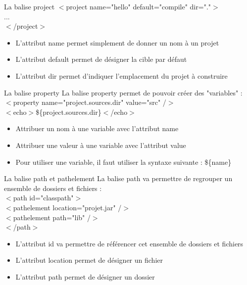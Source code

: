 \documentclass{beamer}
\begin{document}
\begin{frame}{La balise project}
    $<$project name="hello" default="compile" dir="."$>$\\
    ...\\
    $<$/project$>$
    \newline
    \newline
    \begin{itemize}
        \item L'attribut name permet simplement de donner un nom à un projet
        \item L'attribut default permet de d\'esigner la cible par d\'efaut
        \item L'attribut dir permet d'indiquer l'emplacement du projet à construire
    \end{itemize}
\end{frame}

\begin{frame}{La balise property}
    La balise property permet de pouvoir cr\'eer des "variables" :\\
    $<$property name="project.sources.dir" value="src" /$>$\\
    $<$echo$>$\$\{project.sources.dir\}$<$/echo$>$
    \newline
    \newline
    \begin{itemize}
        \item Attribuer un nom \`a une variable avec l'attribut name
        \item Attribuer une valeur \`a une variable avec l'attribut value
        \item Pour utiliser une variable, il faut utiliser la syntaxe suivante : \$\{name\}
    \end{itemize}
\end{frame}

\begin{frame}{La balise path et pathelement}
    La balise path va permettre de regrouper un ensemble de dossiers et fichiers :\\
    $<$path id="classpath"$>$\\
    $<$pathelement location="projet.jar" /$>$\\
    $<$pathelement path="lib" /$>$\\
    $<$/path$>$
    \newline
    \newline
    \begin{itemize}
        \item L'attribut id va permettre de r\'ef\'erencer cet ensemble de dossiers et fichiers
        \item L'attribut location permet de d\'esigner un fichier
        \item L'attribut path permet de d\'esigner un dossier
    \end{itemize}
\end{frame}
\end{document}

